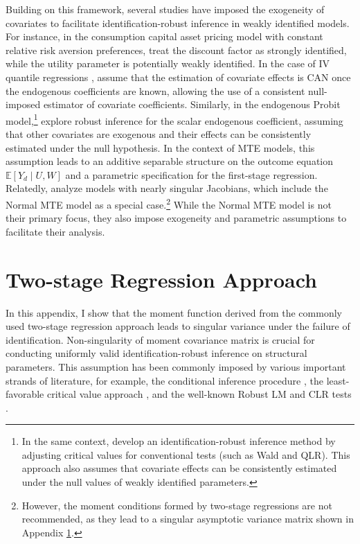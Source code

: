 \documentclass[11pt]{article}
\theoremstyle{definition}
\newcommand{\Exp}{\ensuremath{\mathbb{E}}} %
\newcommand{\0}{\ensuremath{\mathbf{0}}}
\begin{document}
\begin{bibunit}
Building on this framework, several studies have imposed the exogeneity of covariates to facilitate identification-robust inference in weakly identified models. For instance, in the consumption capital asset pricing model with constant relative risk aversion preferences, \cite{stock/wright:2000} treat the discount factor as strongly identified, while the utility parameter is potentially weakly identified. In the case of IV quantile regressions  \citep{chernozhukov/christian:2005}, \cite{andrews/mikusheva:2016b} assume that the estimation of covariate effects is CAN once the endogenous coefficients are known, allowing the use of a consistent null-imposed estimator of covariate coefficients. Similarly, in the endogenous Probit model,\footnote{In the same context,  \cite{andrews/cheng:2014} develop an identification-robust inference method by adjusting critical values for conventional tests (such as Wald and QLR). This approach also assumes that covariate effects can be consistently estimated under the null values of weakly identified parameters.} \cite{andrews/guggenberger:2019} explore robust inference for the scalar endogenous coefficient, assuming that other covariates are exogenous and their effects can be consistently estimated under the null hypothesis. In the context of MTE models, this assumption leads to an additive separable structure on the outcome equation $\Exp[Y_d \mid U, W]$ and a parametric specification for the first-stage regression. Relatedly, \cite{han/mccloskey:2019} analyze models with nearly singular Jacobians, which include the Normal MTE model \citep{bjorklund/moffitt:1987} as a special case.\footnote{However, the moment conditions formed by two-stage regressions \citep{han/mccloskey:2019} are not recommended, as they lead to a singular asymptotic variance matrix shown in Appendix \ref{appendix:control_function}.} While the Normal MTE model is not their primary focus, they also impose exogeneity and parametric assumptions to facilitate their analysis.



\newpage

%
\section{Two-stage Regression Approach}
\label{appendix:control_function}


In this appendix, I show that the moment function derived from the commonly used two-stage regression approach leads to singular variance under the failure of identification. Non-singularity of moment covariance matrix is crucial for conducting uniformly valid identification-robust inference on structural parameters. This assumption has been commonly imposed by various important strands of literature, for example, the conditional inference procedure \citep[Assumption 2]{andrews/mikusheva:2016b}, the least-favorable critical value approach \citep[Assumption GMM 4\textsuperscript{*}]{andrews/cheng:2014}, and the well-known Robust LM and CLR tests \citep[Eq. (3.3)]{andrews/guggenberger:2017}. 



\end{bibunit}
\end{document}
